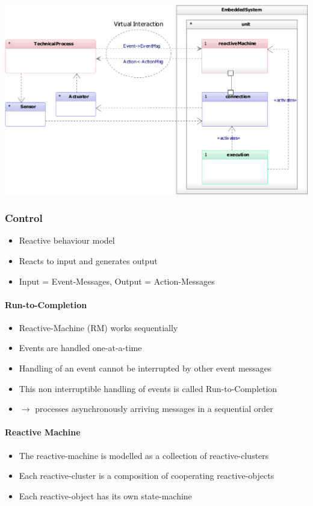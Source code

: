\includegraphics[width=1\textwidth]{images/Modeling/generic_software_architecture.png}

\subsubsection{Control}
\begin{itemize}
    \item Reactive behaviour model
    \item Reacts to input and generates output
    \item Input = Event-Messages, Output = Action-Messages
\end{itemize}

\paragraph{Run-to-Completion}
\begin{itemize}
    \item Reactive-Machine (RM) works sequentially
    \item Events are handled one-at-a-time
    \item Handling of an event cannot be interrupted by other event messages
    \item This non interruptible handling of events is called Run-to-Completion
    \item $\rightarrow$ processes asynchronously arriving messages in a sequential order
\end{itemize}

\paragraph{Reactive Machine}
\begin{itemize}
    \item The reactive-machine is modelled as a collection of reactive-clusters
    \item Each reactive-cluster is a composition of cooperating reactive-objects
    \item Each reactive-object has its own state-machine
\end{itemize}

